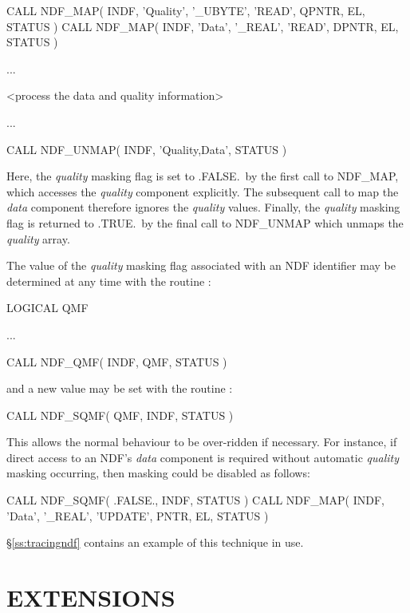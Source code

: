 \documentclass[twoside,11pt,nolof]{starlink}
\providecommand{\st}[1]{{\emph{#1}}}
\begin{document}
\small
\begin{terminalv}
      CALL NDF_MAP( INDF, 'Quality', '_UBYTE', 'READ', QPNTR, EL, STATUS )
      CALL NDF_MAP( INDF, 'Data', '_REAL', 'READ', DPNTR, EL, STATUS )

      ...

      <process the data and quality information>

      ...

      CALL NDF_UNMAP( INDF, 'Quality,Data', STATUS )
\end{terminalv}
\normalsize

Here, the \st{quality\/} masking flag is set to .FALSE.\ by the first call to
NDF\_MAP,  which accesses the \st{quality\/} component explicitly.
The subsequent call to map the \st{data\/} component therefore ignores the
\st{quality\/} values.
Finally, the \st{quality\/} masking flag is returned to .TRUE.\ by the final call
to  NDF\_UNMAP which unmaps the \st{quality\/} array.

The value of the \st{quality\/} masking flag associated with an NDF identifier
may be determined at any time with the routine :

\small
\begin{terminalv}
      LOGICAL QMF

      ...

      CALL NDF_QMF( INDF, QMF, STATUS )
\end{terminalv}
\normalsize

and a new value may be set with the routine :

\small
\begin{terminalv}
      CALL NDF_SQMF( QMF, INDF, STATUS )
\end{terminalv}
\normalsize

This allows the normal behaviour to be over-ridden if necessary.
For instance, if direct access to an NDF's \st{data\/} component is required
without automatic \st{quality\/} masking occurring, then masking could be
disabled as follows:

\small
\begin{terminalv}
      CALL NDF_SQMF( .FALSE., INDF, STATUS )
      CALL NDF_MAP( INDF, 'Data', '_REAL', 'UPDATE', PNTR, EL, STATUS )
\end{terminalv}
\normalsize

\S\ref{ss:tracingndf} contains an example of this technique in use.


\section{EXTENSIONS}
\end{document}
